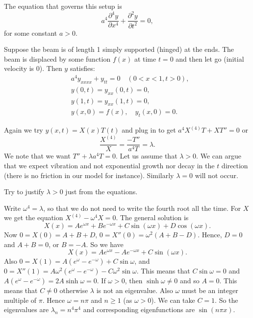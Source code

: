 \documentclass[12pt]{book}
\begin{document}
The equation that governs this setup is
\begin{equation*}
a^4 \frac{\partial^4 y}{\partial x^4} + \frac{\partial^2 y}{\partial t^2} = 0,
\end{equation*}
for some constant $a > 0$.%

Suppose the beam is of length 1 simply supported (hinged) at the ends.
The beam is displaced by some function $f(x)$ at time $t=0$ and then
let go (initial velocity is 0).  Then $y$ satisfies:
\begin{equation} \label{appeig:beameq}
\begin{aligned}
& a^4 y_{xxxx} + y_{tt} = 0 \quad (0 < x < 1, t > 0), \\
& y(0,t) = y_{xx}(0,t) = 0 , \\
& y(1,t) = y_{xx}(1,t) = 0 , \\
& y(x,0) = f(x), \quad y_{t}(x,0) = 0 .
\end{aligned}
\end{equation}

Again we try $y(x,t) = X(x)T(t)$ and plug in to get
$a^4 X^{(4)}T + XT'' = 0$ or 
\begin{equation*}
\frac{X^{(4)}}{X} = \frac{- T''}{a^4T} = \lambda .
\end{equation*}
We note that we want $T'' + \lambda a^4T = 0$.  Let us assume that $\lambda >
0$.  We can argue that we expect vibration and not exponential growth nor
decay in the $t$ direction (there is no friction in our model for instance).
Similarly $\lambda = 0$ will not occur.

\begin{exercise}
Try to justify $\lambda > 0$ just from the equations.
\end{exercise}

Write $\omega^4 = \lambda$, so that we do not need to write the fourth root
all the time.  For $X$ we get the equation $X^{(4)} - \omega^4 X = 0$.  The
general solution is
\begin{equation*}
X(x) = A e^{\omega x} + B e^{-\omega x} + C \sin (\omega x) +
D \cos (\omega x) .
\end{equation*}
Now $0 = X(0) = A+B+D$, $0 = X''(0) = \omega^2 (A + B - D)$.  Hence, $D = 0$ and $A+B = 0$, or $B = - A$.  So we have
\begin{equation*}
X(x) = A e^{\omega x} - A e^{-\omega x} + C \sin (\omega x) .
\end{equation*}
Also $0 = X(1) = A (e^{\omega} - e^{-\omega}) + C \sin \omega$, and
$0 = X''(1) = A \omega^2 (e^{\omega} - e^{-\omega}) - C \omega^2 \sin \omega$.
This means that $C \sin \omega  = 0$ and 
$A (e^{\omega} - e^{-\omega}) = 2 A \sinh \omega = 0$.  If $\omega > 0$, then
$\sinh \omega \not= 0$ and so $A = 0$.  This means that $C \not=0$ otherwise
$\lambda$ is not an
eigenvalue.  Also $\omega$ must be an integer multiple of
$\pi$.   Hence $\omega = n \pi$ and $n \geq 1$ (as $\omega > 0$).  We can take
$C=1$.  So the eigenvalues are $\lambda_n = n^4 \pi^4$ and corresponding eigenfunctions
are $\sin (n \pi x)$.
\end{document}
